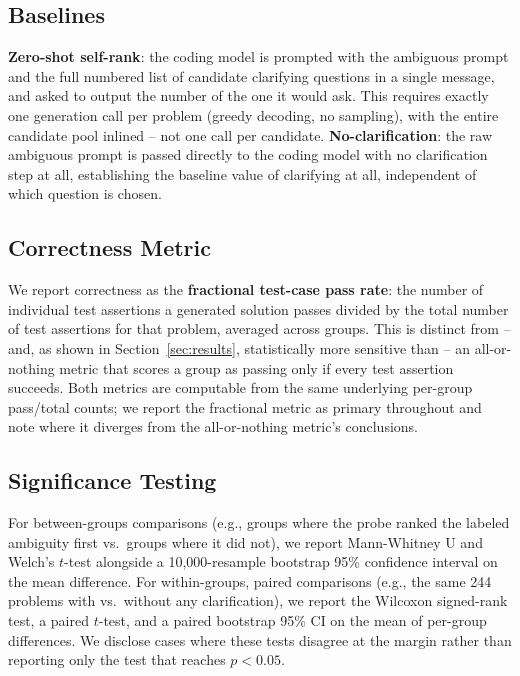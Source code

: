 \subsection{Baselines}

\textbf{Zero-shot self-rank}: the coding model is prompted with the
ambiguous prompt and the full numbered list of candidate clarifying
questions in a single message, and asked to output the number of the one it
would ask. This requires exactly one generation call per problem (greedy
decoding, no sampling), with the entire candidate pool inlined -- not one
call per candidate. \textbf{No-clarification}: the raw ambiguous prompt is
passed directly to the coding model with no clarification step at all,
establishing the baseline value of clarifying at all, independent of which
question is chosen.

\subsection{Correctness Metric}

We report correctness as the \textbf{fractional test-case pass rate}: the
number of individual test assertions a generated solution passes divided by
the total number of test assertions for that problem, averaged across
groups. This is distinct from -- and, as shown in
Section~\ref{sec:results}, statistically more sensitive than -- an
all-or-nothing metric that scores a group as passing only if every test
assertion succeeds. Both metrics are computable from the same underlying
per-group pass/total counts; we report the fractional metric as primary
throughout and note where it diverges from the all-or-nothing metric's
conclusions.

\subsection{Significance Testing}

For between-groups comparisons (e.g., groups where the probe ranked the
labeled ambiguity first vs.\ groups where it did not), we report
Mann-Whitney U and Welch's $t$-test alongside a 10,000-resample bootstrap
95\% confidence interval on the mean difference. For within-groups,
paired comparisons (e.g., the same 244 problems with vs.\ without any
clarification), we report the Wilcoxon signed-rank test, a paired $t$-test,
and a paired bootstrap 95\% CI on the mean of per-group differences. We
disclose cases where these tests disagree at the margin rather than
reporting only the test that reaches $p < 0.05$.

